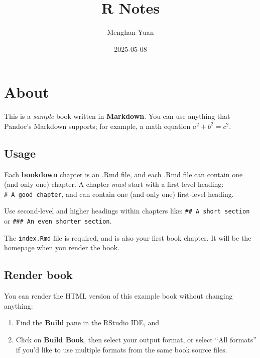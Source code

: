 \documentclass[
  a4paper,
  twoside,
  openright]{book}
\title{R Notes}
\author{Menghan Yuan}
\date{2025-05-08}
\providecommand{\tightlist}{%
  \setlength{\itemsep}{0pt}\setlength{\parskip}{0pt}}
\theoremstyle{definition}
\theoremstyle{definition}
\theoremstyle{definition}
\theoremstyle{definition}
\theoremstyle{remark}
\begin{document}
\maketitle

\let\tightlist\relax
\renewenvironment{Shaded}{\vspace{0.2\baselineskip}\begin{snugshade}}{\end{snugshade}}

% 
% 
% 

{
\setcounter{tocdepth}{1}
\tableofcontents
}
\chapter{About}\label{about}

This is a \emph{sample} book written in \textbf{Markdown}. You can use anything that Pandoc's Markdown supports; for example, a math equation \(a^2 + b^2 = c^2\).

\section{Usage}\label{usage}

Each \textbf{bookdown} chapter is an .Rmd file, and each .Rmd file can contain one (and only one) chapter. A chapter \emph{must} start with a first-level heading: \texttt{\#\ A\ good\ chapter}, and can contain one (and only one) first-level heading.

Use second-level and higher headings within chapters like: \texttt{\#\#\ A\ short\ section} or \texttt{\#\#\#\ An\ even\ shorter\ section}.

The \texttt{index.Rmd} file is required, and is also your first book chapter. It will be the homepage when you render the book.

\section{Render book}\label{render-book}

You can render the HTML version of this example book without changing anything:

\begin{enumerate}
\def\labelenumi{\arabic{enumi}.}
\item
  Find the \textbf{Build} pane in the RStudio IDE, and
\item
  Click on \textbf{Build Book}, then select your output format, or select ``All formats'' if you'd like to use multiple formats from the same book source files.
\end{enumerate}
\end{document}
